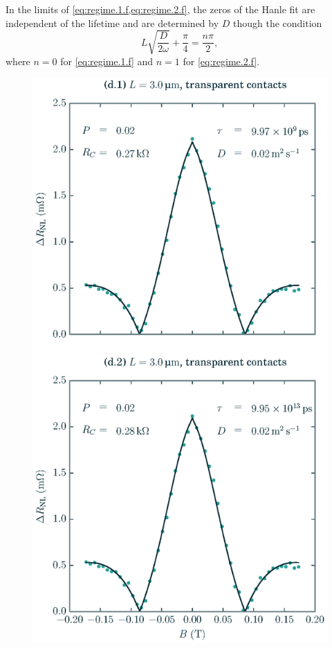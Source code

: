 In the limits of \cref{eq:regime.1.f,eq:regime.2.f},
the zeros of the Hanle fit are independent of the lifetime
and are determined by $D$ though the condition
\begin{equation}
  L \sqrt{\frac{D}{2 ω}} + \frac{π}{4} = \frac{n π}{2} ,
\end{equation}
where $n = 0$ for \cref{eq:regime.1.f} and $n = 1$ for \cref{eq:regime.2.f}.

\begin{figure}
  \centering
  \includegraphics[height=0.8\textheight]{figures/plot_fits_large_lifetime}

\end{figure}
